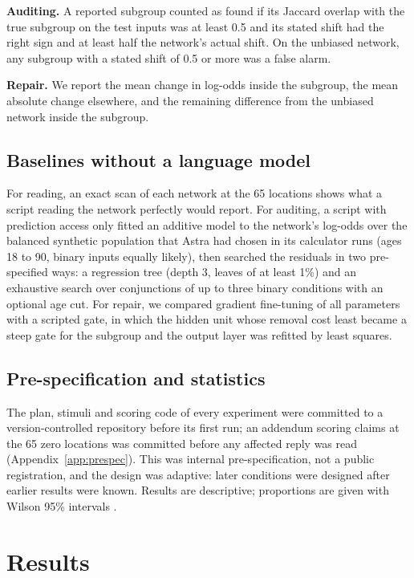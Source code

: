 \documentclass[11pt]{article}
\begin{document}
\textbf{Auditing.} A reported subgroup counted as found if its Jaccard overlap with the true subgroup on the test inputs was at least 0.5 and its stated shift had the right sign and at least half the network's actual shift. On the unbiased network, any subgroup with a stated shift of 0.5 or more was a false alarm.

\textbf{Repair.} We report the mean change in log-odds inside the subgroup, the mean absolute change elsewhere, and the remaining difference from the unbiased network inside the subgroup.

\subsection{Baselines without a language model}

For reading, an exact scan of each network at the 65 locations shows what a script reading the network perfectly would report. For auditing, a script with prediction access only fitted an additive model to the network's log-odds over the balanced synthetic population that Astra had chosen in its calculator runs (ages 18 to 90, binary inputs equally likely), then searched the residuals in two pre-specified ways: a regression tree (depth 3, leaves of at least 1\%) and an exhaustive search over conjunctions of up to three binary conditions with an optional age cut. For repair, we compared gradient fine-tuning of all parameters with a scripted gate, in which the hidden unit whose removal cost least became a steep gate for the subgroup and the output layer was refitted by least squares.

\subsection{Pre-specification and statistics}

The plan, stimuli and scoring code of every experiment were committed to a version-controlled repository before its first run; an addendum scoring claims at the 65 zero locations was committed before any affected reply was read (Appendix~\ref{app:prespec}). This was internal pre-specification, not a public registration, and the design was adaptive: later conditions were designed after earlier results were known. Results are descriptive; proportions are given with Wilson 95\% intervals \cite{wilson1927}.

\section{Results}
\end{document}
